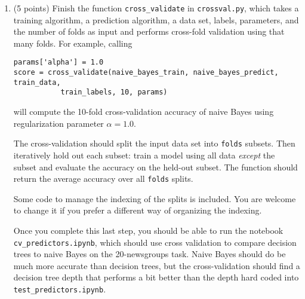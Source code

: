 \documentclass[10pt]{article}
\begin{document}
\begin{enumerate}
\item (5 points) Finish the function \texttt{cross\_validate} in \texttt{crossval.py}, which takes a training algorithm, a prediction algorithm, a data set, labels, parameters, and the number of folds as input and performs cross-fold validation using that many folds. For example, calling
\begin{verbatim}
params['alpha'] = 1.0
score = cross_validate(naive_bayes_train, naive_bayes_predict, train_data, 
           train_labels, 10, params)
\end{verbatim}
will compute the 10-fold cross-validation accuracy of naive Bayes using regularization parameter $\alpha = 1.0$. 

The cross-validation should split the input data set into \texttt{folds} subsets. Then iteratively hold out each subset: train a model using all data \textit{except} the subset and evaluate the accuracy on the held-out subset. The function should return the average accuracy over all \texttt{folds} splits. 

Some code to manage the indexing of the splits is included. You are welcome to change it if you prefer a different way of organizing the indexing.

Once you complete this last step, you should be able to run the notebook \texttt{cv\_predictors.ipynb}, which should use cross validation to compare decision trees to naive Bayes on the 20-newsgroups task. Naive Bayes should do be much more accurate than decision trees, but the cross-validation should find a decision tree depth that performs a bit better than the depth hard coded into \texttt{test\_predictors.ipynb}.

\end{enumerate}
\end{document}
